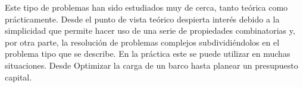 Este tipo de problemas han sido estudiados muy de cerca, tanto teórica como prácticamente. Desde el punto de vista teórico despierta interés debido a la simplicidad que permite hacer uso de una serie de propiedades combinatorias y, por otra parte, la resolución de problemas complejos subdividiéndolos en el problema tipo que se describe. En la práctica este se puede utilizar en muchas situaciones. Desde Optimizar la carga de un barco hasta planear un presupuesto capital. \cite{martello1990knapsack}

